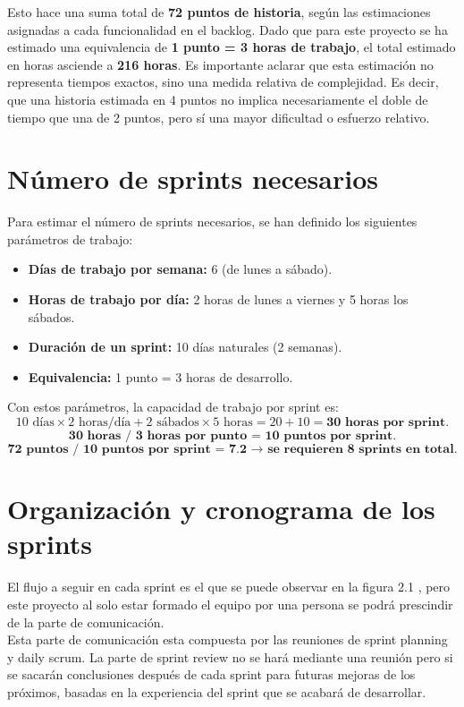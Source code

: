 Esto hace una suma total de \textbf{72 puntos de historia}, según las estimaciones asignadas a cada funcionalidad en el backlog. Dado que para este proyecto se ha estimado una equivalencia de \textbf{1 punto = 3 horas de trabajo}, el total estimado en horas asciende a \textbf{216 horas}. Es importante aclarar que esta estimación no representa tiempos exactos, sino una medida relativa de complejidad. Es decir, que una historia estimada en 4 puntos no implica necesariamente el doble de tiempo que una de 2 puntos, pero sí una mayor dificultad o esfuerzo relativo. \section{Número de sprints necesarios} Para estimar el número de sprints necesarios, se han definido los siguientes parámetros de trabajo: \begin{itemize} \item \textbf{Días de trabajo por semana:} 6 (de lunes a sábado). \item \textbf{Horas de trabajo por día:} 2 horas de lunes a viernes y 5 horas los sábados. \item \textbf{Duración de un sprint:} 10 días naturales (2 semanas). \item \textbf{Equivalencia:} 1 punto = 3 horas de desarrollo. \end{itemize} Con estos parámetros, la capacidad de trabajo por sprint es: \[ 10 \text{ días} \times 2 \text{ horas/día} + 2 \text{ sábados} \times 5 \text{ horas} = 20 + 10 = \textbf{30 horas por sprint}. \] \[ \textbf{30 horas / 3 horas por punto = 10 puntos por sprint}. \] \[ \textbf{72 puntos / 10 puntos por sprint = 7.2 → se requieren 8 sprints en total}. \]


 \newpage
\section{Organización y cronograma de los sprints}
El flujo a seguir en cada sprint es el que se puede observar en la figura 2.1 , pero este proyecto al solo estar formado el equipo por una persona se podrá prescindir de la parte de comunicación. \\

Esta parte de comunicación esta compuesta por las reuniones de sprint planning y daily scrum. La parte de sprint review no se hará mediante una reunión pero si se sacarán conclusiones después de cada sprint para futuras mejoras de los próximos, basadas en la experiencia del sprint que se acabará de desarrollar.

